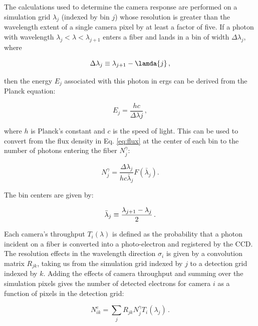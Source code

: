 The calculations used to determine the camera response are performed on a simulation grid $\lambda_{j}$ (indexed by bin $j$) whose resolution is greater than the wavelength extent of a single camera pixel by at least a factor of five. If a photon with wavelength $\lambda_{j} < \lambda < \lambda_{j+1}$ enters a fiber and lands in a bin of width $\Delta \lambda_{j}$, where

\begin{equation}
    \Delta \lambda_{j} \equiv \lambda_{j+1} - \lamda{j}\,,
\end{equation}

then the energy $E_{j}$ associated with this photon in ergs can be derived from the Planck equation:

\begin{equation}
    E_{j} = \frac{hc}{\Delta \lambda{j}}\,,
\end{equation}

where $h$ is Planck's constant and $c$ is the speed of light. This can be used to convert from the flux density in Eq. \ref{eq:flux} at the center of each bin to the number of photons entering the fiber $N_{j}^{\gamma}$:

\begin{equation}
    N_{j}^{\gamma} = \frac{\Delta \lambda_{j}}{hc\bar{\lambda}_{j}}F(\bar{\lambda}_{j}).
\end{equation} 

The bin centers are given by:

\begin{equation}
    \bar{\lambda}_{j} \equiv \frac{\lambda_{j+1} - \lambda_{j}}{2}\,.\\
\end{equation}

Each camera's throughput $T_{i}(\lambda)$ is defined as the probability that a photon incident on a fiber is converted into a photo-electron and registered by the CCD. The resolution effects in the wavelength direction $\sigma_{i}$ is given by a convolution matrix $R_{jk}$, taking us from the simulation grid indexed by $j$ to a detection grid indexed by $k$. Adding the effects of camera throughput and summing over the simulation pixels gives the number of detected electrons for camera $i$ as a function of pixels in the detection grid:

\begin{equation}
    N_{ik}^{e} = \sum_{j}R_{jk}N_{j}^{\gamma}T_{i}(\lambda_{j})\,.
\end{equation}

